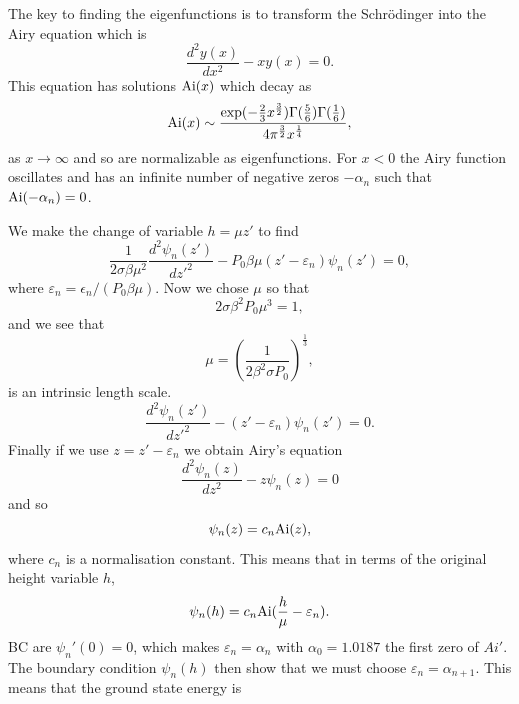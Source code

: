 The key to finding the eigenfunctions is to transform  the Schr\"odinger into the Airy equation which is
\begin{equation}
    \frac{d^2y(x)}{dx^2}- x y(x)=0.
\end{equation}
This equation has solutions ${\rm Ai}(x)$ which decay as 
\begin{equation}
    {\rm Ai}(x) \sim \frac{\exp(-\frac{2}{3} x^{\frac{3}{2}}) \Gamma(\frac{5}{6})\Gamma(\frac{1}{6})}{4\pi^{\frac{3}{2}} x^{\frac{1}{4}}},
\end{equation}
as $x\to\infty$ and so are normalizable as eigenfunctions. For $ x \less 0$ the Airy function  oscillates and has an 
infinite number of negative zeros $-\alpha_n$ such that ${\rm Ai}(-\alpha_n)=0$. 

We make the change of variable $h=\mu z'$ to find
\begin{equation}
    \frac{1}{2\sigma\beta\mu^2}\frac{d^2 \psi_n(z')}{dz'^2}- P_0\beta \mu(z'-\varepsilon_n)\psi_n(z')=0,
\end{equation}
where $\varepsilon_n= \epsilon_n/(P_0\beta\mu)$. Now  we chose $\mu$ so that
\begin{equation}
    2\sigma\beta^2P_0 \mu^3=1,
\end{equation}
and we see that  
\begin{equation}
    \mu = \left(\frac{1}{2\beta^2\sigma P_0}\right)^{\frac{1}{3}},
\end{equation}
is an intrinsic length scale.
\begin{equation}
    \frac{d^2 \psi_n(z')}{dz'^2}- (z'-\varepsilon_n)\psi_n(z')=0.
\end{equation}
Finally if we use $z=z'-\varepsilon_n$ we obtain Airy's equation
\begin{equation}
    \frac{d^2 \psi_n(z)}{dz^2}- z\psi_n(z)=0
\end{equation}
and so
\begin{equation}
    \psi_n(z)= c_n {\rm Ai}(z),
\end{equation}
where $c_n$ is a normalisation constant. This means that in terms of the original height variable $h$, 
\begin{equation}
    \psi_n(h)= c_n {\rm Ai}(\frac{h}{\mu}-\varepsilon_n).
\end{equation}
{\color{red} BC are $\psi_n'(0)=0$, which makes $\varepsilon_n=\alpha_n$ with $\alpha_0=1.0187$ the first zero of $Ai'$.}
The boundary condition $\psi_n(h)$ then show that we must choose $\varepsilon_n=\alpha_{n+1}$. This means that the ground state energy is

